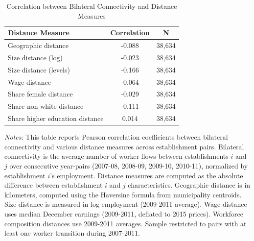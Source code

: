 \begin{table}[htbp]
\centering
\begin{threeparttable}
\caption{Correlation between Bilateral Connectivity and Distance Measures}
\label{tab:corr_bilateral}
\footnotesize
\begin{tabular}{lcc}
\hline\hline
Distance Measure & Correlation & N \\
\hline
Geographic distance & -0.088 & 38,634 \\
Size distance (log) & -0.023 & 38,634 \\
Size distance (levels) & -0.166 & 38,634 \\
Wage distance & -0.064 & 38,634 \\
Share female distance & -0.029 & 38,634 \\
Share non-white distance & -0.111 & 38,634 \\
Share higher education distance & 0.014 & 38,634 \\
\hline\hline
\end{tabular}
\begin{tablenotes}
\footnotesize
\item \textit{Notes:} This table reports Pearson correlation coefficients between bilateral connectivity and various distance measures across establishment pairs. Bilateral connectivity is the average number of worker flows between establishments $i$ and $j$ over consecutive year-pairs (2007-08, 2008-09, 2009-10, 2010-11), normalized by establishment $i$'s employment. Distance measures are computed as the absolute difference between establishment $i$ and $j$ characteristics. Geographic distance is in kilometers, computed using the Haversine formula from municipality centroids. Size distance is measured in log employment (2009-2011 average). Wage distance uses median December earnings (2009-2011, deflated to 2015 prices). Workforce composition distances use 2009-2011 averages. Sample restricted to pairs with at least one worker transition during 2007-2011.
\end{tablenotes}
\end{threeparttable}
\end{table}
